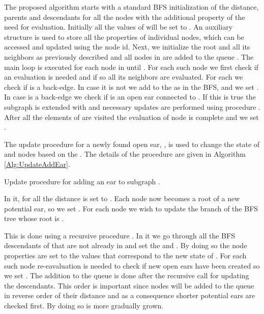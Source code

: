 The proposed algorithm starts with a standard BFS initialization of the distance, parents and descendants for all the nodes with the additional property of the need for evaluation. Initially all the values of  will be set to . An auxiliary structure is used to store all the properties of individual nodes, which can be accessed and updated using  the node id. Next, we initialize the root  and all its neighbors  as previously described and all nodes in  are added to the queue . The main loop is executed for each node  in  until .  For each such node we first check if an evaluation is needed and if so all its neighbors  are evaluated. For each  we check if  is a back-edge. In case it is not we add  to the  as in the BFS, and we set . In case  is a back-edge we check if   is an open ear connected to . If this is true the subgraph  is extended with  and necessary updates are performed using procedure  . After all the elements of  are visited the evaluation of node  is complete and we set .  

The update procedure for a newly found open ear, ,  is used to change the state of  and nodes based on the .  The details of the procedure are given in Algorithm \ref{Alg:UpdateAddEar}.
\begin{algorithm}
\begin{algorithmic}
\ForAll{()}
			\State{}
 		    \State{}
 		    \State{}
\EndFor
\EndProcedure

\ForAll{()}
		\If{ } 
			\State{}
 		    \State{}
  		    \State{}
  		 \EndIf   
\EndFor
\EndProcedure
\end{algorithmic}
\caption{\label{Alg:UpdateAddEar} Update procedure for adding an ear to subgraph .}
\end{algorithm}
In it, for all  the distance is set to . Each node  now becomes a root of a new potential ear, so we set . For each node  we wish to update the branch of the BFS tree whose root is . 

 This is done using a recursive procedure .  In it we go through all the BFS descendants  of  that are not already in  and set the  and . By doing so the node properties are set to the values that correspond to the new state of . For each such node re-eavaluation is needed to check if new open ears have been created so we set . The addition  to the queue  is done after the recursive call   for updating the descendants. This order is important since nodes will be added to the queue in reverse order of their distance and as a consequence shorter potential ears are checked first. By doing so  is more gradually grown. 
 

